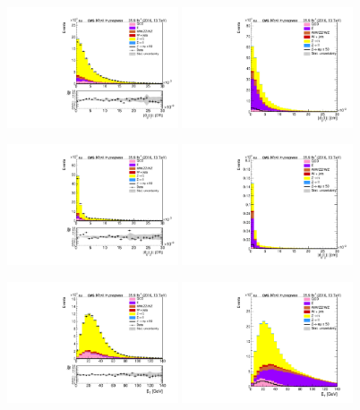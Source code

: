 \begin{figure}[htp]
	\includegraphics[width=0.45\textwidth]{plots/em/ImpactParameter1_CR.pdf}
	\includegraphics[width=0.45\textwidth]{plots/em/ImpactParameter1_withsignal.pdf}

	\includegraphics[width=0.45\textwidth]{plots/em/ImpactParameter2_CR.pdf}
	\includegraphics[width=0.45\textwidth]{plots/em/ImpactParameter2_withsignal.pdf}

	\includegraphics[width=0.45\textwidth]{plots/em/MissingTranverseEnergy_CR.pdf}
	\includegraphics[width=0.45\textwidth]{plots/em/MissingTranverseEnergy_withsignal.pdf}
\end{figure}

